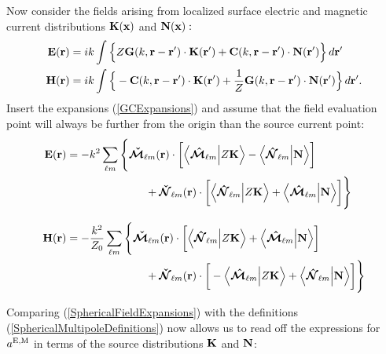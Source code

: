 \documentclass[letterpaper]{article}
\begin{document}
Now consider the fields arising from localized surface electric
and magnetic current distributions $\mathbf{K}(\mathbf{x})$ and $\mathbf{N}(\mathbf{x}):$
\begin{align*}
 \mathbf{E}(\mathbf{r}) 
&= 
   ik\int \Big\{ Z\mathbf{G}(k, \mathbf{r}-\mathbf{r}^\prime) \cdot \mathbf{K}(\mathbf{r}^\prime)
                 +\mathbf{C}(k, \mathbf{r}-\mathbf{r}^\prime) \cdot \mathbf{N}(\mathbf{r}^\prime)
          \Big\} \, d\mathbf{r}^\prime
\\
 \mathbf{H}(\mathbf{r}) 
&= 
   ik\int \Big\{ -\mathbf{C}(k, \mathbf{r}-\mathbf{r}^\prime) \cdot \mathbf{K}(\mathbf{r}^\prime)
                 +\frac{1}{Z}\mathbf{G}(k, \mathbf{r}-\mathbf{r}^\prime) \cdot \mathbf{N}(\mathbf{r}^\prime)
          \Big\}\,d\mathbf{r}^\prime.
\end{align*}
Insert the expansions (\ref{GCExpansions}) and assume that the 
field evaluation point will always be further from the origin than
the source current point: 
\begin{subequations}
\begin{align*}
 \mathbf{E}(\mathbf{r}) 
&= 
 -k^2 \sum_{\ell m} 
       \Bigg\{ \boldsymbol{\check{\mathcal{M}}}_{\ell m}(\mathbf{r}) \cdot 
               \bigg[   \Big\langle  \boldsymbol{\hat{\mathcal{M}}}_{\ell m}  \Big| Z \mathbf{K} \Big\rangle
                      - \Big\langle  \boldsymbol{\hat{\mathcal{N}}}_{\ell m}  \Big| \mathbf{N} \Big\rangle
               \bigg]
\\
&\hspace{1.0in}
             + \boldsymbol{\check{\mathcal{N}}}_{\ell m}(\mathbf{r}) \cdot 
               \bigg[   \Big\langle  \boldsymbol{\hat{\mathcal{N}}}_{\ell m}  \Big| Z \mathbf{K} \Big\rangle
                      + \Big\langle  \boldsymbol{\hat{\mathcal{M}}}_{\ell m}  \Big| \mathbf{N} \Big\rangle
               \bigg]
       \Bigg\}
\\[8pt]
 \mathbf{H}(\mathbf{r}) 
&= -\frac{k^2}{Z_0} \sum_{\ell m} 
       \Bigg\{ \boldsymbol{\check{\mathcal{M}}}_{\ell m}(\mathbf{r}) \cdot 
               \bigg[   \Big\langle  \boldsymbol{\hat{\mathcal{N}}}_{\ell m}  \Big| Z\mathbf{K} \Big\rangle
                      + \Big\langle  \boldsymbol{\hat{\mathcal{M}}}_{\ell m}  \Big| \mathbf{N} \Big\rangle
               \bigg]
\\
&\hspace{1.0in}
             + \boldsymbol{\check{\mathcal{N}}}_{\ell m}(\mathbf{r}) \cdot 
               \bigg[ - \Big\langle  \boldsymbol{\hat{\mathcal{M}}}_{\ell m}  \Big| Z\mathbf{K} \Big\rangle
                      + \Big\langle  \boldsymbol{\hat{\mathcal{N}}}_{\ell m}  \Big| \mathbf{N} \Big\rangle
               \bigg]
       \Bigg\}
\end{align*}
\label{SphericalFieldExpansions}
\end{subequations}

Comparing (\ref{SphericalFieldExpansions}) with the definitions
(\ref{SphericalMultipoleDefinitions}) now allows us to read off
the expressions for $a^{\hbox{\scriptsize{E,M}}}$ in terms of the source
distributions $\mathbf{K}$ and $\mathbf{N}$: 
\end{document}
